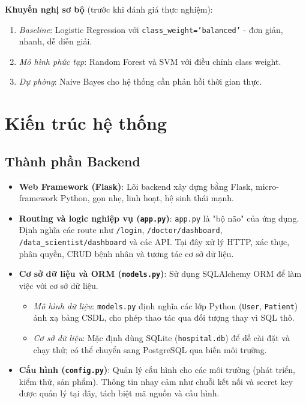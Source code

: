 ﻿\documentclass{article}
\begin{document}
\textbf{Khuyến nghị sơ bộ} (trước khi đánh giá thực nghiệm):
\begin{enumerate}
    \item \textit{Baseline}: Logistic Regression với \texttt{class\_weight='balanced'} - đơn giản, nhanh, dễ diễn giải.
    \item \textit{Mô hình phức tạp}: Random Forest và SVM với điều chỉnh class weight.
    \item \textit{Dự phòng}: Naive Bayes cho hệ thống cần phản hồi thời gian thực.
\end{enumerate}

\section{Kiến trúc hệ thống}
\subsection{Thành phần Backend}
\begin{itemize}
    \item \textbf{Web Framework (Flask)}: Lõi backend xây dựng bằng Flask, micro-framework Python, gọn nhẹ, linh hoạt, hệ sinh thái mạnh.
    
    \item \textbf{Routing và logic nghiệp vụ (\texttt{app.py})}: \texttt{app.py} là "bộ não" của ứng dụng. Định nghĩa các route như \texttt{/login}, \texttt{/doctor/dashboard}, \texttt{/data\_scientist/dashboard} và các API. Tại đây xử lý HTTP, xác thực, phân quyền, CRUD bệnh nhân và tương tác cơ sở dữ liệu.
    
    \item \textbf{Cơ sở dữ liệu và ORM (\texttt{models.py})}: Sử dụng SQLAlchemy ORM để làm việc với cơ sở dữ liệu.
    \begin{itemize}
        \item \textit{Mô hình dữ liệu}: \texttt{models.py} định nghĩa các lớp Python (\texttt{User}, \texttt{Patient}) ánh xạ bảng CSDL, cho phép thao tác qua đối tượng thay vì SQL thô.
        \item \textit{Cơ sở dữ liệu}: Mặc định dùng SQLite (\texttt{hospital.db}) để dễ cài đặt và chạy thử; có thể chuyển sang PostgreSQL qua biến môi trường.
    \end{itemize}
    
    \item \textbf{Cấu hình (\texttt{config.py})}: Quản lý cấu hình cho các môi trường (phát triển, kiểm thử, sản phẩm). Thông tin nhạy cảm như chuỗi kết nối và secret key được quản lý tại đây, tách biệt mã nguồn và cấu hình.
\end{itemize}
\end{document}
